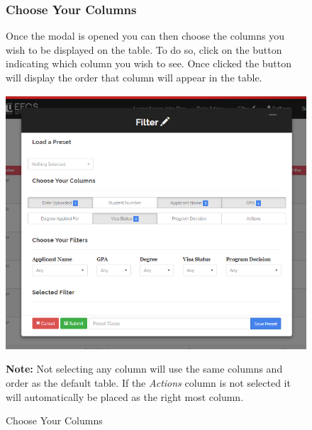 \documentclass[fontsize=12pt,paper=letter,twoside]{scrartcl}
\begin{document}
\begin{figure}[!htb]
\subsubsection{Choose Your Columns}
Once the modal is opened you can then choose the columns you wish to be displayed on the table. To do so, click on the button indicating which column you wish to see. Once clicked the button will display the order that column will appear in the table.

\begin{center}
\includegraphics[width=.99\textwidth]{images/ma/selected_col.png}
\end{center}
\caption{Choose Your Columns}
\label{fig:choose_columns}

\smallskip
\noindent \textbf{Note:} Not selecting any column will use the same columns and order as the default table. If the \emph{Actions} column is not selected it will automatically be placed as the right most column. 
\end{figure}
\end{document}
